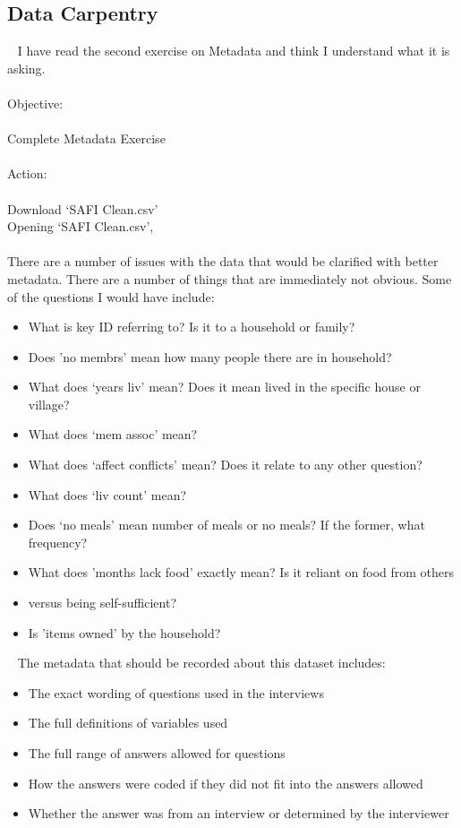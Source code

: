 \documentclass{article}
\begin{document}
\subsection*{Data Carpentry}
 
I have read the second exercise on Metadata and think I understand what it is asking.
\\\\
Objective:\\\\
Complete Metadata Exercise\\\\
Action:\\\\
Download ‘SAFI Clean.csv’\\
Opening ‘SAFI Clean.csv’,\\\\
There are a number of issues with the data that would be clarified with better metadata. There are a number of things that are immediately not obvious. Some of the questions I would have include:
\begin{itemize}
\item What is key ID referring to? Is it to a household or family?
\item Does 'no membrs' mean how many people there are in household?
\item What does ‘years liv’ mean? Does it mean lived in the specific house or village?
\item What does ‘mem assoc’ mean?
\item What does ‘affect conflicts’ mean? Does it relate to any other question?
\item What does ‘liv count’ mean?
\item Does ‘no meals’ mean number of meals or no meals? If the former, what frequency?
\item What does 'months lack food' exactly mean? Is it reliant on food from others \item versus being self-sufficient?
\item Is 'items owned' by the household?
\end{itemize} 
The metadata that should be recorded about this dataset includes:
\begin{itemize}
\item The exact wording of questions used in the interviews
\item The full definitions of variables used
\item The full range of answers allowed for questions
\item How the answers were coded if they did not fit into the answers allowed
\item Whether the answer was from an interview or determined by the interviewer
\end{itemize}
\end{document}
